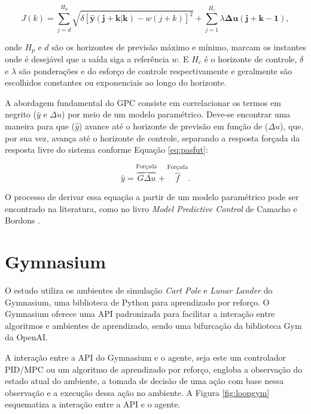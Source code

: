 \documentclass[12pt,           %
a4paper,                       %
openany,                       %
oneside,                       %
chapter=TITLE,                 %
english,                       %
spanish,                       %
brazil,                        %
sumario=tradicional]{abntex2}  %
\begin{document}
\begin{OnehalfSpace}
\begin{equation}
    \label{eq:custo}
    J(k) = \sum_{j=d}^{H_p} \sqrt{\delta[\boldsymbol{\hat{y}(j+k|k)} - w(j+k)]^2} +  \sum_{j=1}^{H_c} \lambda \boldsymbol{\Delta u(j+k-1)},
\end{equation}

\noindent onde $H_p$ e $d$ são os horizontes de previsão máximo e mínimo, marcam os instantes onde é desejável que a saída siga a referência $w$. E $H_c$ é o horizonte de controle, $\delta$ e $\lambda$ são ponderações e do esforço de controle respectivamente e geralmente são escolhidos constantes ou exponenciais ao longo do horizonte.

A abordagem fundamental do GPC consiste em correlacionar os termos em negrito ($\hat{y}$ e $\Delta u$) por meio de um modelo paramétrico. Deve-se encontrar uma maneira para que ($\hat{y}$) avance até o horizonte de previsão em função de ($\Delta u$), que, por sua vez, avança até o horizonte de controle, separando a resposta forçada da resposta livre do sistema conforme  Equação \ref{eq:pasfut}:

\begin{equation}
	\label{eq:pasfut}
	\hat{y} = \overbrace{G\Delta u}^{\text{Forçada}} + \overbrace{f}^{\text{Forçada}}.
\end{equation}

O processo de derivar essa equação a partir de um modelo paramétrico pode ser encontrado na literatura, como no livro \textit{Model Predictive Control} de Camacho e Bordons  \cite{camacho2004}.

\section{Gymnasium}
\label{sec:AE}

O estudo utiliza os ambientes de simulação \textit{Cart Pole} e \textit{Lunar Lander} do Gymnasium, uma biblioteca de Python para aprendizado por reforço. O Gymnasium oferece uma API padronizada para facilitar a interação entre algoritmos e ambientes de aprendizado, sendo uma bifurcação da biblioteca Gym da OpenAI.

A interação entre a API do Gymnasium e o agente, seja este um controlador PID/MPC ou um algoritmo de aprendizado por reforço, engloba a observação do estado atual do ambiente, a tomada de decisão de uma ação com base nessa observação e a execução dessa ação no ambiente. A Figura \ref{fig:loopgym} esquematiza a interação entre a API e o agente.


\end{OnehalfSpace}
\end{document}

